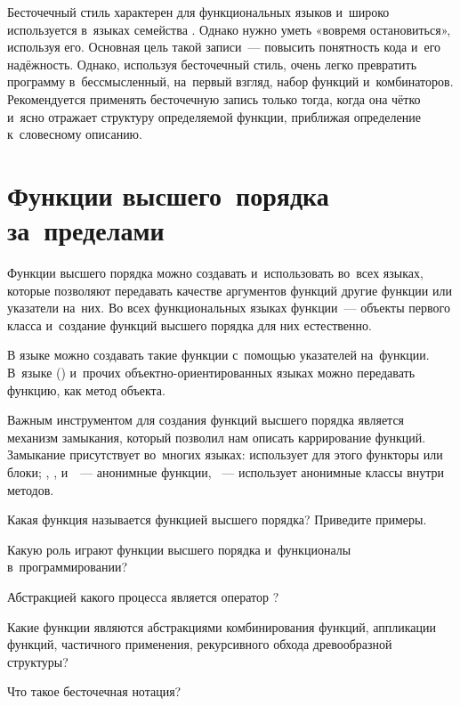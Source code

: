 Бесточечный стиль характерен для функциональных языков и~широко используется в~языках семейства . Однако нужно уметь «вовремя остановиться», используя его. Основная цель такой записи~--- повысить понятность кода и~его надёжность. Однако, используя бесточечный стиль, очень легко превратить программу в~бессмысленный, на~первый взгляд, набор функций и~комбинаторов. Рекомендуется применять бесточечную запись только тогда, когда она чётко и~ясно отражает структуру определяемой функции, приближая определение к~словесному описанию.

\section[4]{Функции высшего~порядка \mbox{за~пределами~\Scheme}}%
Функции высшего порядка можно создавать и~использовать во~всех языках, которые позволяют передавать качестве аргументов функций другие функции или указатели на~них.
Во всех функциональных языках функции~--- объекты первого класса и~создание функций высшего порядка для них естественно.

В языке  можно создавать такие функции с~помощью указателей на~функции. В~языке  () и~прочих объектно-ориентированных языках можно передавать функцию, как метод объекта.

Важным инструментом для создания функций высшего порядка является механизм замыкания, который позволил нам описать каррирование функций. Замыкание присутствует во~многих языках:  использует для этого функторы или блоки; , ,  и~~--- анонимные функции, ~--- использует анонимные классы внутри методов.

\begin{Queeze}

\item Какая функция называется функцией высшего порядка? Приведите примеры.

 \item Какую роль играют функции высшего порядка и~функционалы в~программировании?

 \item Абстракцией какого процесса является оператор ?

 \item Какие функции являются абстракциями комбинирования функций, аппликации функций, частичного применения, рекурсивного обхода древообразной структуры?

 \item Что такое бесточечная нотация?

\end{Queeze}